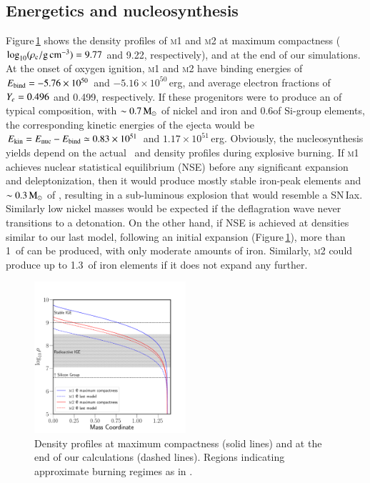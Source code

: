 \documentclass[twocolumn]{aa}
\begin{document}
\subsection{Energetics and nucleosynthesis}\label{sec:3}
Figure\,\ref{fig:nuc} shows the density profiles of \textsc{m1} and \textsc{m2} at maximum compactness ($\log_{10} (\rho_{\mathrm{c}}/ \mathrm{g\,cm^{-3}})=9.77$ and 9.22, respectively), and at the end of our simulations. At the onset of oxygen ignition, \textsc{m1} and \textsc{m2} have binding energies of $E_{\rm bind}=-5.76\times10^{50}$ and $-5.16\times10^{50}$\,erg, and average electron fractions of $Y_e= 0.496$ and  0.499, respectively. If these progenitors were to produce an \ia of  typical composition, with $\sim 0.7\mathrm{\,M_\odot}$ of nickel and iron and 0.6\msun of Si-group elements, the corresponding kinetic energies of the ejecta would be $E_{\rm kin}=E_{\rm nuc}-E_{\rm bind}\simeq 0.83\times10^{51}$ and  $1.17\times10^{51}$\,erg. 
Obviously, the nucleosynthesis yields depend on the actual
\ye\ and density profiles during explosive burning. If 
\textsc{m1} achieves nuclear statistical equilibrium (NSE)
before any significant expansion and deleptonization, then it
would produce mostly stable iron-peak elements and $\sim 0.3\mathrm{\,M_\odot}$ of , resulting in a sub-luminous 
explosion that would resemble a SN\,Iax.  Similarly low nickel masses would be expected if the deflagration wave never transitions to a detonation. On the other hand, if NSE is achieved at densities similar to our last \mesa model, following an 
initial expansion (Figure\,\ref{fig:nuc}), more than 
1\msun\ of  can be produced, with only moderate
amounts of iron. Similarly, \textsc{m2} could produce up 
to 1.3\msun\ of iron elements if it does not expand any further. 

\begin{figure}
\begin{center}
\includegraphics[width=0.5\textwidth]{composition.pdf}
\caption{Density profiles at maximum compactness (solid lines) and at the end of our \mesa calculations (dashed lines). Regions indicating approximate burning regimes as in \cite{Seitenzahl2017}.}
\label{fig:nuc}
\end{center}
\end{figure}
\end{document}
